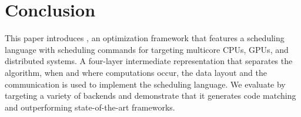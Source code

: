\vspace{-0.25cm}
\section{Conclusion}

This paper introduces \framework, an optimization framework that features a scheduling language with scheduling commands for targeting multicore CPUs, GPUs, and distributed systems.  A four-layer intermediate representation that separates the algorithm, when and where computations occur, the data layout and the communication is used to implement the scheduling language.
We evaluate \framework by targeting a variety of backends and demonstrate that it generates code matching and outperforming state-of-the-art frameworks.

\newpage

